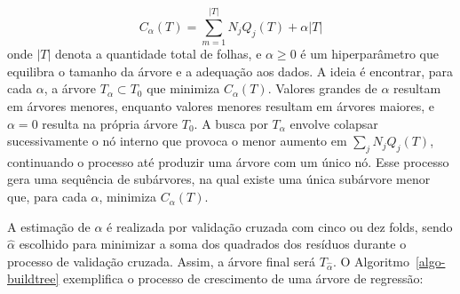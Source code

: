 \documentclass[
  12pt,
  a4paper,
]{scrreprt}
\begin{document}
\[
C_{\alpha}\left(T\right) = \sum_{m = 1}^{|T|}N_jQ_j\left(T\right) + \alpha |T|
\] onde \(|T|\) denota a quantidade total de folhas, e \(\alpha \geq 0\)
é um hiperparâmetro que equilibra o tamanho da árvore e a adequação aos
dados. A ideia é encontrar, para cada \(\alpha\), a árvore
\(T_{\alpha} \subset T_0\) que minimiza \(C_{\alpha}\left(T\right)\).
Valores grandes de \(\alpha\) resultam em árvores menores, enquanto
valores menores resultam em árvores maiores, e \(\alpha = 0\) resulta na
própria árvore \(T_0\). A busca por \(T_{\alpha}\) envolve colapsar
sucessivamente o nó interno que provoca o menor aumento em
\(\sum_j N_j Q_j\left(T\right)\), continuando o processo até produzir
uma árvore com um único nó. Esse processo gera uma sequência de
subárvores, na qual existe uma única subárvore menor que, para cada
\(\alpha\), minimiza \(C_{\alpha}\left(T\right)\).

\vspace{12pt}

A estimação de \(\alpha\) é realizada por validação cruzada com cinco ou
dez folds, sendo \(\hat \alpha\) escolhido para minimizar a soma dos
quadrados dos resíduos durante o processo de validação cruzada. Assim, a
árvore final será \(T_{\hat \alpha}\). O
 Algoritmo~\ref{algo-buildtree}  exemplifica o processo de crescimento
de uma árvore de regressão:
\end{document}
